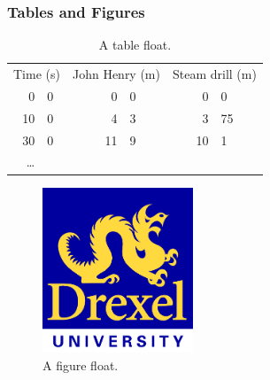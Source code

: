 \subsubsection{Tables and Figures}
\Blindtext[2]
\begin{table}
  \begin{center}
  \begin{tabular}{r@{.}l r@{.}l r@{.}l}
    \multicolumn{2}{c}{Time (s)} &
      \multicolumn{2}{c}{John Henry (m)} &
      \multicolumn{2}{c}{Steam drill (m)} \\
    0&0 & 0&0 & 0&0 \\
    10&0 & 4&3 & 3&75 \\
    30&0 & 11&9 & 10&1 \\
    \ldots
  \end{tabular}
  \caption{A table float.} %
  \end{center}
\end{table}
\Blindtext[2]
\begin{figure}
  \caption{A figure float. \blindtext} %
  \begin{center}
    \includegraphics[width=0.4\textwidth]{drexel-logo}
  \end{center}
\end{figure}
\Blindtext[3]
